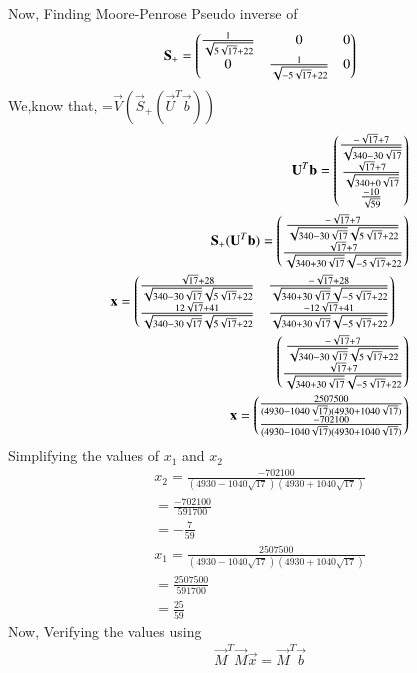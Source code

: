 \documentclass[journal,12pt,twocolumn]{IEEEtran}
\begin{document}
Now, Finding Moore-Penrose Pseudo inverse of 
\begin{align}
\mathbf{S}_+=\begin{pmatrix}\frac{1}{\sqrt{5\sqrt{17}+22}}&0&0\\0&\frac{1}{\sqrt{-5\sqrt{17}+22}}&0\end{pmatrix}
\end{align}
We,know that,
=$\vec{V}(\vec{S}_+(\vec{U}^T\vec{b}))$
\begin{align}
\vec{U}^T\vec{b}=\myvec{\frac{-\sqrt{17}+7}{\sqrt{340-30\sqrt{17}}}\\\frac{\sqrt{17}+7}{\sqrt{340+0\sqrt{17}}}\\\frac{-10}{\sqrt{59}}}\\
\vec{S}_+(\vec{U}^T\vec{b})=\myvec{\frac{-\sqrt{17}+7}{\sqrt{340-30\sqrt{17}}\sqrt{5\sqrt{17}+22}}\\\frac{\sqrt{17}+7}{\sqrt{340+30\sqrt{17}}\sqrt{-5\sqrt{17}+22}}}\\
\begin{multlined}
\vec{x}=\myvec{\frac{\sqrt{17}+28}{\sqrt{340-30\sqrt{17}}\sqrt{5\sqrt{17}+22}}&\frac{-\sqrt{17}+28}{\sqrt{340+30\sqrt{17}}\sqrt{-5\sqrt{17}+22}}\\\frac{12\sqrt{17}+41}{\sqrt{340-30\sqrt{17}}\sqrt{5\sqrt{17}+22}}&\frac{-12\sqrt{17}+41}{\sqrt{340+30\sqrt{17}}\sqrt{-5\sqrt{17}+22}}}\\
\myvec{\frac{-\sqrt{17}+7}{\sqrt{340-30\sqrt{17}}\sqrt{5\sqrt{17}+22}}\\\frac{\sqrt{17}+7}{\sqrt{340+30\sqrt{17}}\sqrt{-5\sqrt{17}+22}}}
\end{multlined}\\
\vec{x}=\myvec{\frac{2507500}{(4930-1040\sqrt{17})(4930+1040\sqrt{17})}\\\frac{-702100}{(4930-1040\sqrt{17})(4930+1040\sqrt{17})}}
\end{align}
Simplifying the values of $x_1$ and $x_2$
\begin{align}
x_2=\frac{-702100}{(4930-1040\sqrt{17})(4930+1040\sqrt{17})}\\
=\frac{-702100}{591700}\\
=-\frac{7}{59}
\end{align}
\begin{align}
x_1=\frac{2507500}{(4930-1040\sqrt{17})(4930+1040\sqrt{17})}\\
=\frac{2507500}{591700}\\
=\frac{25}{59}
\end{align}
Now, Verifying the values using
\begin{align}
\vec{M}^T\vec{M}\vec{x} = \vec{M}^T\vec{b}
\end{align}
\end{document}
